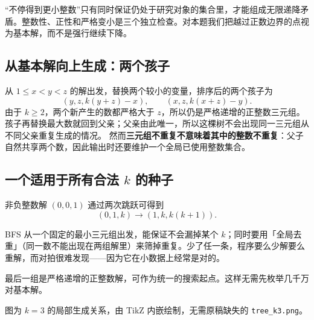 \documentclass[UTF8,a4paper,11pt,oneside,openany,fontset=fandol]{ctexbook}
\theoremstyle{definition}
\begin{document}
\begin{pitfall}
“不停得到更小整数”只有同时保证仍处于研究对象的集合里，才能组成无限递降矛盾。整数性、正性和严格变小是三个独立检查。对本题我们把越过正数边界的点视为基本解，而不是强行继续下降。
\end{pitfall}

\subsection{从基本解向上生成：两个孩子}
从 $1\le x<y<z$ 的解出发，替换两个较小的变量，排序后的两个孩子为
\[
 (y,z,k(y+z)-x),\qquad (x,z,k(x+z)-y).
\]
由于 $k\ge2$，两个新产生的数都严格大于 $z$，所以仍是严格递增的正整数三元组。孩子再替换最大数就回到父亲；父亲由此唯一，所以这棵树不会出现同一三元组从不同父亲重复生成的情况。
然而\textbf{三元组不重复不意味着其中的整数不重复}：父子自然共享两个数，因此输出时还要维护一个全局已使用整数集合。

\subsection{一个适用于所有合法 \texorpdfstring{$k$}{k} 的种子}
非负整数解 $(0,0,1)$ 通过两次跳跃可得到
\[
 (0,1,k)\longrightarrow(1,k,k(k+1)).
\]

\begin{tip}
BFS 从一个固定的最小三元组出发，能保证不会漏掉某个 $k$；同时要用「全局去重」（同一数不能出现在两组解里）来筛掉重复。少了任一条，程序要么少解要么重解，而对拍很难发现——因为它在小数据上经常是对的。
\end{tip}

最后一组是严格递增的正整数解，可作为统一的搜索起点。这样无需先枚举几千万对基本解。

\begin{center}
\end{center}
图为 $k=3$ 的局部生成关系，由 TikZ 内嵌绘制，无需原稿缺失的 \texttt{tree\_k3.png}。
\end{document}

